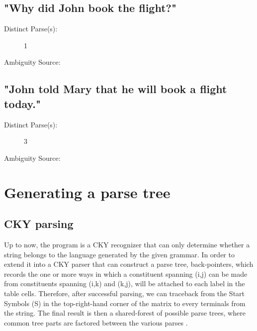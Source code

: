 \documentclass{article}
\begin{document}
\subsection{"Why did John book the flight?"}

\begin{description}
	\item[Distinct Parse(s):]
	1
	\item[Ambiguity Source:]
	
\end{description}

\subsection{"John told Mary that he will book a flight today."}

\begin{description}
	\item[Distinct Parse(s):]
	3
	\item[Ambiguity Source:]
	
\end{description}



\section{Generating a parse tree}

\subsection{CKY parsing}

Up to now, the program is a CKY recognizer that can only determine whether a string belongs to the language generated by the given grammar. In order to extend it into a CKY parser that can construct a parse tree, back-pointers, which records the one or more ways in which a constituent spanning (i,j) can be made from constituents spanning (i,k) and (k,j), will be attached to each label in the table cells. Therefore, after successful parsing, we can traceback from the Start Symbols (S) in the top-right-hand corner of the matrix to every terminals from the string. The final result is then a shared-forest of possible parse trees, where common tree parts are factored between the various parses \cite{lang1994recognition}.
\end{document}
